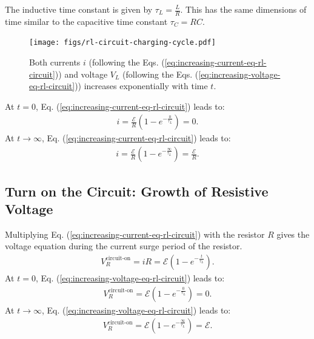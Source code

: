 \documentclass[12pt,b4paper]{article}
\begin{document}
The inductive time constant is given by $\displaystyle\tau_L=\frac{L}{R}$. This has the same dimensions of time similar to the capacitive time constant $\tau_C=RC$.
\begin{figure}
    \centering
    \texttt{[image: figs/rl-circuit-charging-cycle.pdf]}
    \caption{Both currents $i$ (following the Eqs. (\ref{eq:increasing-current-eq-rl-circuit})) and voltage $V_L$ (following the Eqs. (\ref{eq:increasing-voltage-eq-rl-circuit})) increases exponentially with time $t$.}
    \label{fig:rl-charging-cycle}
\end{figure}
At $t=0$, Eq. (\ref{eq:increasing-current-eq-rl-circuit}) leads to:
\begin{align*}
    i=\frac{\mathcal{E}}{R}\left(1-e^{\displaystyle-\frac{0}{\tau_L}}\right)=0.
\end{align*}
At $t\to\infty$, Eq. (\ref{eq:increasing-current-eq-rl-circuit}) leads to:
\begin{align*}
    i=\frac{\mathcal{E}}{R}\left(1-e^{\displaystyle-\frac{\infty}{\tau_L}}\right)=\frac{\mathcal{E}}{R}.
\end{align*}
\subsection{Turn on the Circuit: Growth of Resistive Voltage}
Multiplying Eq. (\ref{eq:increasing-current-eq-rl-circuit}) with the resistor $R$ gives the voltage equation during the current surge period of the resistor.
\begin{align}
    V_R^\text{circuit-on}=iR=\mathcal{E}\left(1-e^{\displaystyle-\frac{t}{\tau_L}}\right).\label{eq:increasing-voltage-eq-rl-circuit}
\end{align}
At $t=0$, Eq. (\ref{eq:increasing-voltage-eq-rl-circuit}) leads to:
\begin{align*}
    V_R^\text{circuit-on}=\mathcal{E}\left(1-e^{\displaystyle-\frac{0}{\tau_L}}\right)=0.
\end{align*}
At $t\to\infty$, Eq. (\ref{eq:increasing-voltage-eq-rl-circuit}) leads to:
\begin{align*}
    V_R^\text{circuit-on}=\mathcal{E}\left(1-e^{\displaystyle-\frac{\infty}{\tau_L}}\right)=\mathcal{E}.
\end{align*}
\end{document}
